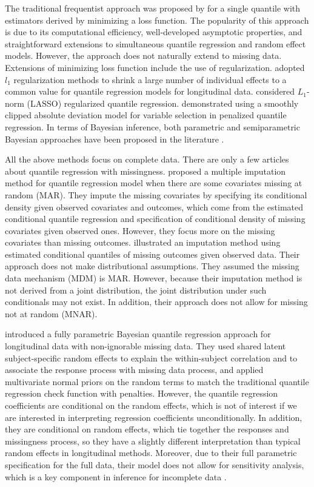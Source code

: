 \documentclass[useAMS,usenatbib,referee]{biom}
\begin{document}
The traditional frequentist approach was proposed by
\citet{koenker1978} for a single quantile with estimators derived by
minimizing a loss function. The popularity of this approach is due to
its computational efficiency, well-developed asymptotic properties,
and straightforward extensions to simultaneous quantile regression and
random effect models. However, the approach does not naturally
extend to missing data.
Extensions of minimizing loss function include the use of regularization.
\citet{koenker2004} adopted $l_1$ regularization methods to shrink a large number of individual effects to a common value for quantile regression models for longitudinal data.
\citet{li2008} considered $L_1$-norm (LASSO) regularized quantile regression.
\citet{wu2009} demonstrated using a smoothly clipped absolute deviation model for variable selection in penalized quantile regression.
In terms of Bayesian inference, both parametric and semiparametric Bayesian approaches have been proposed in the literature \citep{yu2001,walker1999,hanson2002,reich2010}.

All the above methods focus on complete data.  There are only a few
articles about quantile regression with missingness.  \citet{wei2012}
proposed a multiple imputation method for quantile regression model
when there are some covariates missing at random (MAR). They impute
the missing covariates by specifying its conditional density given
observed covariates and outcomes, which come from the estimated
conditional quantile regression and specification of conditional
density of missing covariates given observed ones.
However, they focus more on the missing covariates than missing outcomes.
\citet{bottai2013} illustrated an imputation method using estimated
conditional quantiles of missing outcomes given observed data. Their
approach does not make distributional assumptions.  They assumed the
missing data mechanism (MDM) is MAR. However, because their
imputation method is not derived from a joint distribution, the joint
distribution under such conditionals may not exist.  In addition, their
approach does not allow for missing not at random (MNAR).

\citet{yuan2010} introduced a fully parametric Bayesian quantile
regression approach for longitudinal data with non-ignorable missing
data. They used shared latent subject-specific random effects to
explain the within-subject correlation and to associate the response
process with missing data process, and applied multivariate normal
priors on the random terms to match the traditional quantile
regression check function with penalties. However, the quantile
regression coefficients are conditional on the random effects, which
is not of interest if we are interested in interpreting regression
coefficients unconditionally.  In addition, they are
conditional on random effects, which tie together the responses and
missingness process, so they have a slightly different interpretation
than typical random effects in longitudinal methods. Moreover, due to
their full parametric specification for the full data, their model
does not allow for sensitivity analysis, which is a key component in
inference for incomplete data \citep{nas2010}.
\end{document}
